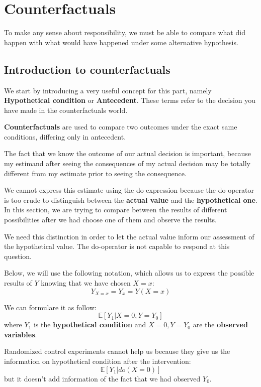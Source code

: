 \chapter{Counterfactuals}
To make any sense about responsibility, we must be able to compare what did happen
with what would have happened under some alternative hypothesis.
\section{Introduction to counterfactuals}
We start by introducing a very useful concept for this part, namely \textbf{Hypothetical
    condition} or \textbf{Antecedent}. These terms refer to the decision you
have made in the counterfactuals world.

\textbf{Counterfactuals} are used to compare two outcomes under the exact same
conditions, differing only in antecedent.

The fact that we know the outcome of our actual decision is important, because
my estimand after seeing the consequences of my actual decision may be totally
different from my estimate prior to seeing the consequence.

We cannot express this estimate using the do-expression because the do-operator
is too crude to distinguish between the \textbf{actual value} and the
\textbf{hypothetical one}. In this section, we are trying to compare between the
results of different possibilities after we had choose one of them and observe
the results.

We need this distinction in order to let the actual value inform our assessment
of the hypothetical value. The do-operator is not capable to respond at this question.

Below, we will use the following notation, which allows us to express the possible
results of $Y$ knowing that we have chosen $X = x$:
\begin{equation}
    Y_{X = x} = Y_x = Y(X = x)
\end{equation}

We can formulare it as follow:
\begin{equation}
    \mathbb{E}[Y_1 | X = 0, Y = Y_0]
\end{equation}
where $Y_1$ is the \textbf{hypothetical condition} and $X = 0,Y = Y_0$ are the
\textbf{observed variables}.

\begin{note}
    Randomized control experiments cannot help us because they give us the information
    on hypothetical condition after the intervention:
    \begin{equation*}
        \mathbb{E}[Y_1 | do(X = 0)]
    \end{equation*}
    but it doesn't add information of the fact that we had observed $Y_0$.
\end{note}

